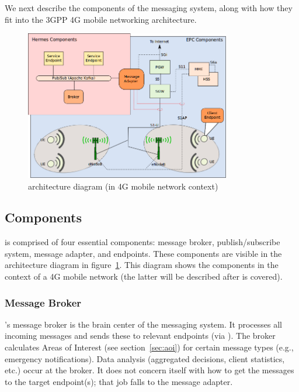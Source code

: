We next describe the components of the \name{} messaging system, along
with how they fit into the 3GPP 4G mobile networking architecture.

\begin{figure}[ht]
  \centering
  \includegraphics[width=0.8\textwidth]{figs/mercury-arch.png}
  \caption{\name{} architecture diagram (in 4G mobile network context)}
  \label{fig:arch}
\end{figure}

\subsection{\name{} Components}

\name{} is comprised of four essential components: message broker,
publish/subscribe system, message adapter, and endpoints.  These
components are visible in the architecture diagram in
figure~\ref{fig:arch}. This diagram shows the \name{} components
in the context of a 4G mobile network (the latter will be described
after \name{} is covered).

\subsubsection{Message Broker}

\name's message broker is the brain center of the messaging
system. It processes all incoming messages and sends these to relevant
endpoints (via \pubsub). The broker calculates Areas of Interest (see
section~\ref{sec:aoi}) for certain message types (e.g., emergency
notifications).  Data analysis (aggregated decisions, client
statistics, etc.) occur at the broker. It does not concern itself with
how to get the messages to the target endpoint(s); that job falls to
the \name{} message adapter.

